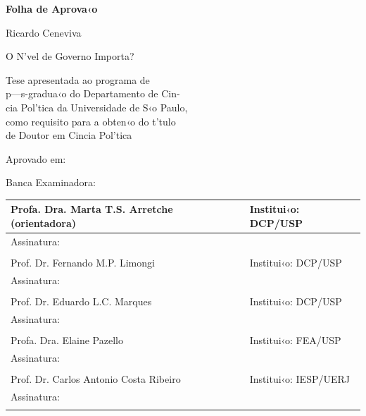 \documentclass[a4paper, 12pt]{article}
\begin{document}



\sf\pagestyle{plain}
\thispagestyle{empty}

\begin{center}
\bf{Folha de Aprova‹o}
\end{center}

\vspace*{1cm} 

Ricardo Ceneviva

O N’vel de Governo Importa? 


\begin{flushright}
\small{Tese apresentada ao programa de \\
p—s-gradua‹o do Departamento  de Cin-\\
cia Pol’tica da Universidade de S‹o Paulo, \\
como requisito para a obten‹o do t’tulo \\
de Doutor em Cincia Pol’tica\\}
\end{flushright}


Aprovado em: 


Banca Examinadora:

\doublespacing
\begin{tabular}{p{8cm} p{5cm}}

Profa. Dra. Marta T.S. Arretche (orientadora) & Institui‹o: DCP/USP \\ \hline
Assinatura: \\ \hline
                          \\   

Prof. Dr. Fernando M.P. Limongi & Institui‹o: DCP/USP \\ \hline
Assinatura: \\ \hline
                          \\   

Prof. Dr. Eduardo L.C. Marques & Institui‹o: DCP/USP\\ \hline
Assinatura: \\ \hline
                          \\   

Profa. Dra. Elaine Pazello & Institui‹o: FEA/USP \\ \hline
Assinatura: \\ \hline
                          \\   

Prof. Dr. Carlos Antonio Costa Ribeiro & Institui‹o: IESP/UERJ\\ \hline
Assinatura: \\ \hline
                          \\   

\end{tabular}
\singlespacing
\end{document}
